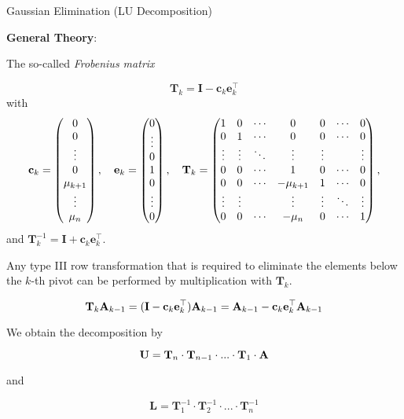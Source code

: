 \documentclass[11pt,compress,t,notes=noshow, xcolor=table]{beamer}
\begin{document}
\begin{vbframe}{Gaussian Elimination (LU Decomposition)}
\begin{enumerate}
\textbf{General Theory}:\\
\medskip

The so-called \emph{Frobenius matrix}

$$
\mathbf{T}_k = \mathbf{I} - \mathbf{c}_k\mathbf{e}_k^\top
$$
with \scriptsize
$$
\mathbf{c}_k = \begin{pmatrix} 
0 \\
0 \\
\vdots \\
0 \\
\mu_{k + 1} \\
\vdots \\
\mu_n  \end{pmatrix},
\quad \mathbf{e}_k = \begin{pmatrix} 
0 \\
\vdots \\
0 \\
1 \\
0 \\
\vdots \\
0  \end{pmatrix}, \quad
\mathbf{T}_k = \begin{pmatrix} 
1      & 0      & \cdots & 0            & 0      & \cdots & 0 \\
0      & 1      & \cdots & 0            & 0      & \cdots & 0 \\
\vdots & \vdots & \ddots & \vdots       & \vdots &        & \vdots \\
0      & 0      & \cdots & 1            & 0      & \cdots & 0 \\
0      & 0      & \cdots & -\mu_{k + 1} & 1      & \cdots & 0 \\
\vdots & \vdots &        & \vdots       & \vdots & \ddots & \vdots \\
0      & 0      & \cdots & -\mu_n       & 0      & \cdots & 1  \end{pmatrix},
$$ \normalsize
and $\mathbf{T}_k^{-1} = \mathbf{I} + \mathbf{c}_k\mathbf{e}_k^\top$.

\framebreak

Any type III row transformation that is required to eliminate the elements below the $k$-th pivot can be performed by multiplication with $\mathbf{T}_k$.

$$
\mathbf{T}_k\mathbf{A}_{k - 1} = (\mathbf{I} - \mathbf{c}_k\mathbf{e}_k^\top)\mathbf{A}_{k - 1} =
\mathbf{A}_{k - 1} - \mathbf{c}_k\mathbf{e}_k^\top\mathbf{A}_{k - 1}
$$

\lz

We obtain the decomposition by 

$$
\mathbf{U} = \mathbf{T}_n\cdot \mathbf{T}_{n - 1} \cdot ... \cdot \mathbf{T}_1 \cdot \mathbf{A}
$$

and

$$
\mathbf{L} = \mathbf{T}_1^{-1} \cdot \mathbf{T}_2^{-1} \cdot ... \cdot \mathbf{T}_n^{-1}
$$


\end{enumerate}
\end{vbframe}
\end{document}
